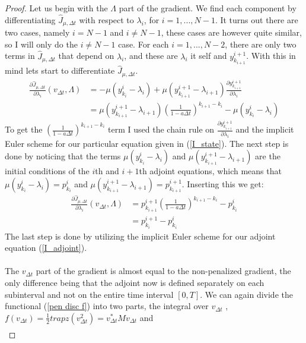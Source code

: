 \begin{proof}
Let us begin with the $\Lambda$ part of the gradient. We find each component by differentiating $\hat J_{\mu,\Delta t} $ with respect to $\lambda_i$, for $i=1,...,N-1$. It turns out there are two cases, namely $i=N-1$ and $i\neq N-1$, these cases are however quite similar, so I will only do the $i\neq N-1$ case. For each $i=1,...,N-2$, there are only two terms in $\hat J_{\mu,\Delta t} $ that depend on $\lambda_i$, and these are $\lambda_i$ it self and $y_{k_{i+1}}^{i+1}$. With this in mind lets start to differentiate $\hat J_{\mu,\Delta t} $.
\begin{align*}
\frac{\partial\hat J_{\mu,\Delta t}}{\partial \lambda_i}(v_{\Delta t},\Lambda) &=-\mu (y_{k_i}^i-\lambda_i) +\mu(y_{k_{i+1}}^{i+1}-\lambda_{i+1})\frac{\partial y_{k_{i+1}}^{i+1}}{\partial \lambda_i}  \\
&=\mu(y_{k_{i+1}}^{i+1}-\lambda_{i+1})(\frac{1}{1-a\Delta t})^{k_{i+1}-k_i} -\mu (y_{k_i}^i-\lambda_i)
\end{align*}
To get the $(\frac{1}{1-a\Delta t})^{k_{i+1}-k_i}$ term I used the chain rule on $\frac{\partial y_{k_{i+1}}^{i+1}}{\partial \lambda_i}$ and the implicit Euler scheme for our particular equation given in (\ref{I_state}). The next step is done by noticing that the terms $\mu (y_{k_i}^i-\lambda_i)$ and $\mu(y_{k_{i+1}}^{i+1}-\lambda_{i+1})$ are the initial conditions of the $i$th and $i+1$th adjoint equations, which means that $\mu (y_{k_i}^i-\lambda_i)=p_{k_i}^{i}$ and $\mu(y_{k_{i+1}}^{i+1}-\lambda_{i+1})=p_{k_{i+1}}^{i+1}$. Inserting this we get:
\begin{align*}
\frac{\partial\hat J_{\mu,\Delta t}}{\partial \lambda_i}(v_{\Delta t},\Lambda) &=p_{k_{i+1}}^{i+1}(\frac{1}{1-a\Delta t})^{k_{i+1}-k_i} -p_{k_i}^{i} \\
&= p_{k_{i}}^{i+1}-p_{k_i}^{i}
\end{align*}
The last step is done by utilizing the implicit Euler scheme for our adjoint equation (\ref{I_adjoint}).
\\
\\
The $v_{\Delta t}$ part of the gradient is almost equal to the non-penalized gradient, the only difference being that the adjoint now is defined separately on each subinterval and not on the entire time interval $[0,T]$. We can again divide the functional (\ref{pen disc f}) into two parts, the integral over $v_{\Delta t}$ , $f(v_{\Delta t})=\frac{1}{2} trapz(v_{\Delta t}^2)=v_{\Delta t}^*Mv_{\Delta t}$ and 
\begin{align*}

\end{align*}
\end{proof}
